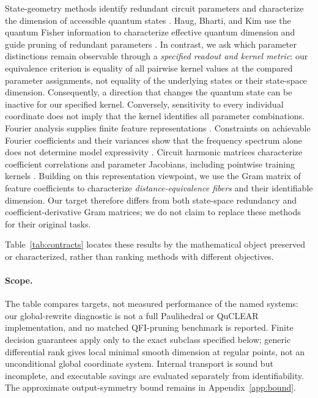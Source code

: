 \documentclass[a4paper,twocolumn,11pt,unpublished]{quantumarticle}
\begin{document}
State-geometry methods identify redundant circuit parameters and
characterize the dimension of accessible quantum states
\cite{funcke,haug}. Haug, Bharti, and Kim use the quantum Fisher
information to characterize effective quantum dimension and guide
pruning of redundant parameters \cite{haug}. In contrast, we ask which
parameter distinctions remain observable through a \emph{specified
readout and kernel metric}: our equivalence criterion is equality of
all pairwise kernel values at the compared parameter assignments,
not equality of the underlying states or their state-space dimension.
Consequently, a direction that changes the quantum state can be
inactive for our specified kernel. Conversely, sensitivity to every
individual coordinate does not imply that the kernel identifies all
parameter combinations. Fourier analysis supplies finite feature
representations \cite{schuldFourier}. Constraints on achievable
Fourier coefficients and their variances show that the frequency
spectrum alone does not determine model expressivity
\cite{mhiri2025constrained}. Circuit harmonic matrices
characterize coefficient correlations and parameter Jacobians,
including pointwise training kernels \cite{CHM}. Building on this
representation viewpoint, we use the Gram matrix of feature
coefficients to characterize \emph{distance-equivalence fibers} and
their identifiable dimension. Our target therefore differs from
both state-space redundancy and coefficient-derivative Gram matrices;
we do not claim to replace these methods for their original tasks.

Table~\ref{tab:contracts} locates these results
by the mathematical object preserved or characterized, rather than
ranking methods with different objectives.

\paragraph{Scope.}
The table compares targets, not measured performance of the named
systems: our global-rewrite diagnostic is not a full Paulihedral or
QuCLEAR implementation, and no matched QFI-pruning benchmark is reported.
Finite decision guarantees apply only to the exact subclass specified
below; generic differential rank gives local minimal smooth dimension
at regular points, not an unconditional global coordinate system.
Internal transport is sound but incomplete, and executable savings
are evaluated separately from identifiability. The approximate
output-symmetry bound remains in Appendix~\ref{app:bound}.
\end{document}
